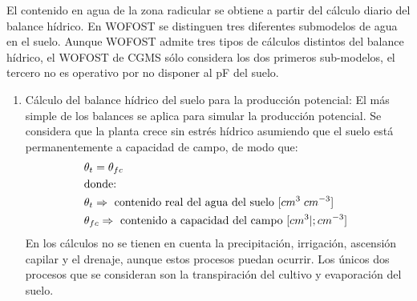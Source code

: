 El contenido en agua de la zona radicular se obtiene a partir del cálculo diario del balance hídrico. En WOFOST se distinguen tres diferentes submodelos de agua en el suelo. Aunque WOFOST admite tres tipos de cálculos distintos del balance hídrico, el WOFOST de CGMS sólo considera los dos primeros sub-modelos, el tercero no es operativo por no disponer al pF del suelo.
\begin{enumerate}
	\item Cálculo del balance hídrico del suelo para la producción potencial: El más simple de los balances se aplica para simular la producción potencial. Se considera que la planta crece sin estrés hídrico asumiendo que el suelo está permanentemente a capacidad de campo, de modo que:
	\begin{align*}
		&\theta_t=\theta_{fc} \\
		&\text{donde: } \\
		&\theta_t  \Rightarrow \text{ contenido real del agua del suelo [$ cm^3 \; cm^{-3} $] } \\
		&\theta_{fc}  \Rightarrow \text{ contenido a capacidad del campo [$ cm^3 |; cm^{-3} $] } \\
	\end{align*}
	En los cálculos no se tienen en cuenta la precipitación, irrigación, ascensión capilar y el drenaje, aunque estos procesos puedan ocurrir. Los únicos dos procesos que se consideran son la transpiración del cultivo y evaporación del suelo.
	

\end{enumerate}
